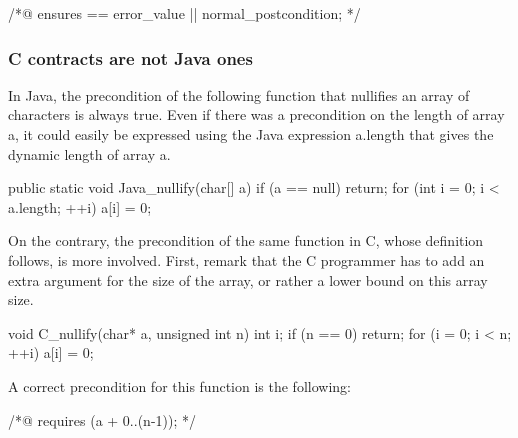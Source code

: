 \begin{listing-nonumber}
/*@ ensures \result == error_value || normal_postcondition; */
\end{listing-nonumber}




%


\subsubsection*{C contracts are not Java ones}

In Java, the precondition of the following function that nullifies an
array of characters is always true. Even if there was a precondition
on the length of array {\ttfamily a}, it could easily be expressed using
the Java expression {\ttfamily a.length} that gives the dynamic length
of array {\ttfamily a}.

\begin{listing}{1}
public static void Java_nullify(char[] a) {
  if (a == null) return;
  for (int i = 0; i < a.length; ++i) {
    a[i] = 0;
  }
}
\end{listing}

On the contrary, the precondition of the same function in C, whose
definition follows, is more involved. First, remark that the
C programmer has to add an extra argument for the size of the array,
or rather a lower bound on this array size.

\begin{listing}{1}
void C_nullify(char* a, unsigned int n) {
  int i;
  if (n == 0) return;
  for (i = 0; i < n; ++i) {
    a[i] = 0;
  }
}
\end{listing}

\noindent
A correct precondition for this function is the following:

\begin{listing-nonumber}
/*@ requires \valid(a + 0..(n-1)); */
\end{listing-nonumber}

